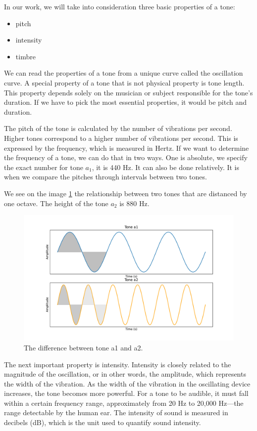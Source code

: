 In our work, we will take into consideration three basic properties of a tone:
\begin{itemize}
    \item{pitch}
    \item{intensity}
    \item{timbre}
\end{itemize}

We can read the properties of a tone from a unique curve called the oscillation curve. A special property of a tone that is not physical property is tone length. This property depends solely on the musician or subject responsible for the tone's duration. If we have to pick the most essential properties, it would be pitch and duration.

The pitch of the tone is calculated by the number of vibrations per second. Higher tones correspond to a higher number of vibrations per second. This is expressed by the frequency, which is measured in Hertz. If we want to determine the frequency of a tone, we can do that in two ways. One is absolute, we specify the exact number for tone $a_1$, it is 440 Hz. It can also be done relatively. It is when we compare the pitches through intervals between two tones.

We see on the image \ref{fig:a1a2} the relationship between two tones that are distanced by one octave. The height of the tone $a_2$ is 880 Hz.

\begin{figure}[H]
    \centering
    \includegraphics[scale=0.55]{obrazky-figures/a1a2tones.pdf}
    \caption{The difference between tone a1 and a2.}
    \label{fig:a1a2}
\end{figure}

The next important property is intensity. Intensity is closely related to the magnitude of the oscillation, or in other words, the amplitude, which represents the width of the vibration. As the width of the vibration in the oscillating device increases, the tone becomes more powerful. For a tone to be audible, it must fall within a certain frequency range, approximately from 20 Hz to 20,000 Hz—the range detectable by the human ear. The intensity of sound is measured in decibels (dB), which is the unit used to quantify sound intensity.

